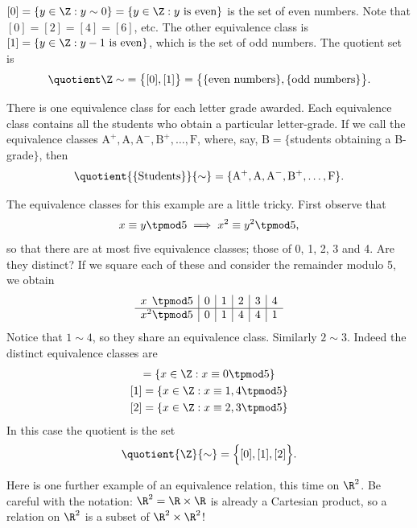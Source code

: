 \begin{examples}
	\item $[0]=\{y\in\Z:y\sim 0\}=\{y\in\Z:y\text{ is even}\}$ is the set of even numbers. Note that $[0]=[2]=[4]=[6]$, etc. The other equivalence class is $[1]=\{y\in\Z:y-1\text{ is even}\}$, which is the set of odd numbers. The quotient set is
	\[\smash{\quotient \Z\sim}=\bigl\{[0],[1]\bigr\}=\bigl\{\{\text{even numbers}\},\{\text{odd numbers}\}\bigr\}.\]

	\item There is one equivalence class for each letter grade awarded. Each equivalence class contains all the students who obtain a particular letter-grade. If we call the equivalence classes $\mathrm{A^+,A,A^-,B^+,\ldots,F}$, where, say, $\mathrm B=\{$students obtaining a B-grade$\}$, then
	\[\smash{\quotient{\{\text{Students}\}}{\sim}}=\{\mathrm{A^+,A,A^-,B^+,\ldots,F}\}.\]

	\item The equivalence classes for this example are a little tricky. First observe that
	\[x\equiv y\tpmod 5\implies x^2\equiv y^2\tpmod 5,\]
	so that there are at most five equivalence classes; those of 0, 1, 2, 3 and 4. Are they distinct?	If we square each of these and consider the remainder modulo 5, we obtain
	\[\begin{array}{l@{}r|c|c|c|c|c}
	x&\tpmod 5&0&1&2&3&4\\\hline
	x^2&\tpmod 5&0&1&4&4&1
	\end{array}\]
	Notice that $1\sim 4$, so they share an equivalence class. Similarly $2\sim 3$. Indeed the distinct equivalence classes are
	\begin{gather*}
	[0]=\{x\in\Z:x\equiv 0\tpmod 5\}\\
	[1]=\{x\in\Z:x\equiv 1,4\tpmod 5\}\\
	[2]=\{x\in\Z:x\equiv 2,3\tpmod 5\}
	\end{gather*}
	In this case the quotient is the set
	\[\smash{\quotient{\Z}{\sim}}=\Bigl\{[0],[1],[2]\Bigr\}.\]
\end{examples}%

\noindent Here is one further example of an equivalence relation, this time on $\R^2$. Be careful with the notation: $\R^2=\R\times\R$ is already a Cartesian product, so a relation on $\R^2$ is a subset of $\R^2\times\R^2$!


